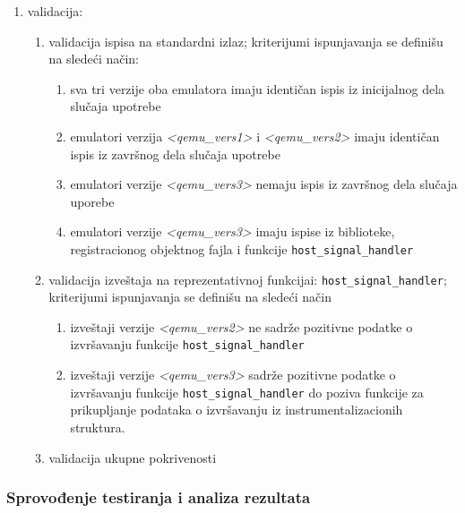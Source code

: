 \documentclass[12pt,oneside]{memoir}
\newcommand{\kod}[1]{\texttt{#1}}
\newcommand{\strano}[1]{\textit{#1}}
\begin{document}
\begin{enumerate}
\item validacija: 
\begin{enumerate}
\item validacija ispisa na standardni izlaz; kriterijumi ispunjavanja se definišu na sledeći način:
\begin{enumerate}
\item sva tri verzije oba emulatora imaju identičan ispis iz inicijalnog dela slučaja upotrebe
\item emulatori verzija \strano{<qemu\_vers1>} i \strano{<qemu\_vers2>} imaju identičan ispis iz završnog dela slučaja upotrebe
\item emulatori verzije \strano{<qemu\_vers3>} nemaju ispis iz završnog dela slučaja uporebe
\item emulatori verzije \strano{<qemu\_vers3>} imaju ispise iz biblioteke, registracionog objektnog fajla i funkcije \kod{host\_signal\_handler}
\end{enumerate}

\item validacija izveštaja na reprezentativnoj funkcijai: \kod{host\_signal\_handler}; kriterijumi ispunjavanja se definišu na sledeći način
\begin{enumerate}
\item izveštaji verzije \strano{<qemu\_vers2>} ne sadrže pozitivne podatke o izvršavanju funkcije \kod{host\_signal\_handler}
\item izveštaji verzije \strano{<qemu\_vers3>} sadrže pozitivne podatke o izvršavanju funkcije \kod{host\_signal\_handler} do poziva funkcije za prikupljanje podataka o izvršavanju iz instrumentalizacionih struktura.
\end{enumerate}

\item validacija ukupne pokrivenosti 
\end{enumerate}

\end{enumerate}


\subsubsection{Sprovođenje testiranja i analiza rezultata}
\end{document}
